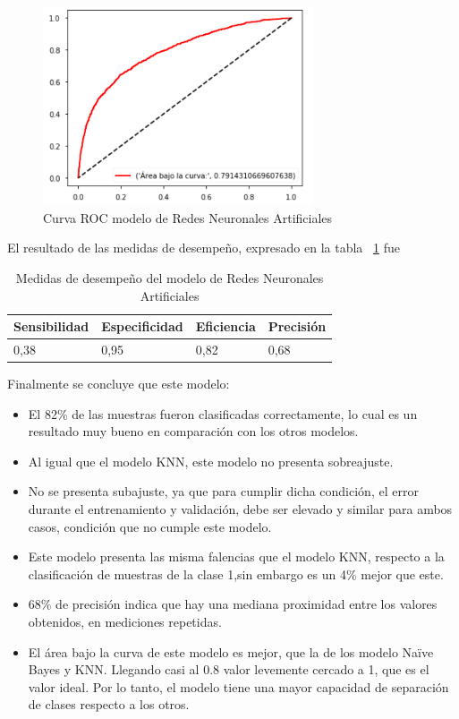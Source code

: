 \documentclass[conference]{IEEEtran}
\begin{document}
\begin{center}
    \begin{figure}[h]
        \hfill
     \centerline{\includegraphics[width=8cm]{ROCGNA.png}}
    \caption{Curva ROC modelo de Redes Neuronales Artificiales }
    \label{fig:rocRNA}
    \end{figure}  
\end{center}
El resultado de las medidas de desempeño, expresado en la tabla ~\ref{tab:medidasRNA} fue
\newline
\begin{table}[H]
\centering
\begin{tabular}{|l|l|l|l|}
\hline
Sensibilidad & Especificidad & \multicolumn{1}{r|}{Eficiencia} & Precisión \\ \hline
0,38         & 0,95          & 0,82                            & 0,68      \\ \hline
\end{tabular}
\caption{Medidas de desempeño del modelo de Redes Neuronales Artificiales}
\label{tab:medidasRNA}
\end{table}
Finalmente se concluye que este modelo:
\begin{itemize}
\item El 82\% de las muestras fueron clasificadas correctamente, lo cual es un resultado muy bueno en comparación con los otros modelos.
\item Al igual que el modelo KNN, este modelo no presenta sobreajuste. 
\item No se presenta subajuste, ya que para cumplir dicha condición, el error durante el entrenamiento y validación, debe ser elevado y similar para ambos casos, condición que no cumple este modelo.
\item Este modelo presenta las misma falencias que el modelo KNN, respecto a la clasificación de muestras de la clase 1,sin embargo es un 4\% mejor que este.
\item 68\% de precisión indica que hay una mediana proximidad entre los valores obtenidos, en mediciones repetidas.
\item El área bajo la curva de este modelo es mejor, que la de los modelo Naïve Bayes y KNN. Llegando casi al 0.8 valor levemente cercado a 1, que es el valor ideal. Por lo tanto, el modelo  tiene una mayor capacidad de separación de clases respecto a los otros.
\end{itemize}
\end{document}
